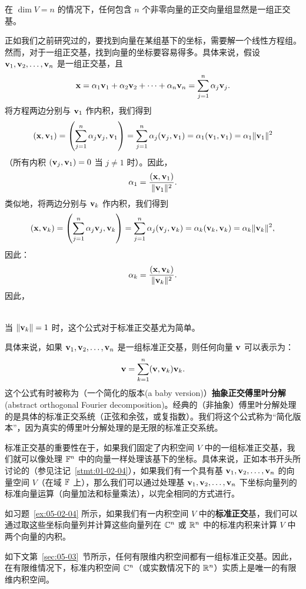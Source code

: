 在 $\dim V = n$ 的情况下，任何包含 $n$ 个非零向量的正交向量组显然是一组正交基。

正如我们之前研究过的，要找到向量在某组基下的坐标，需要解一个线性方程组。然而，对于一组正交基，找到向量的坐标要容易得多。具体来说，假设 $\mathbf{v}_1, \mathbf{v}_2, \dots, \mathbf{v}_n$ 是一组正交基，且 $$\mathbf{x} = \alpha_1 \mathbf{v}_1 + \alpha_2 \mathbf{v}_2 + \dots + \alpha_n \mathbf{v}_n = \sum_{j=1}^n \alpha_j \mathbf{v}_j.$$
将方程两边分别与 $\mathbf{v}_1$ 作内积，我们得到
$$(\mathbf{x}, \mathbf{v}_1) = \left(\sum_{j=1}^n \alpha_j \mathbf{v}_j, \mathbf{v}_1\right) = \sum_{j=1}^n \alpha_j (\mathbf{v}_j, \mathbf{v}_1) = \alpha_1 (\mathbf{v}_1, \mathbf{v}_1) = \alpha_1 \|\mathbf{v}_1\|^2$$
 （所有内积 $(\mathbf{v}_j, \mathbf{v}_1) = 0$ 当 $j \ne 1$ 时）。因此，
 $$\alpha_1 = \frac{(\mathbf{x}, \mathbf{v}_1)}{\|\mathbf{v}_1\|^2}.$$
 类似地，将两边分别与 $\mathbf{v}_k$ 作内积，我们得到
 $$(\mathbf{x}, \mathbf{v}_k) = \left(\sum_{j=1}^n \alpha_j \mathbf{v}_j, \mathbf{v}_k\right) = \sum_{j=1}^n \alpha_j (\mathbf{v}_j, \mathbf{v}_k) = \alpha_k (\mathbf{v}_k, \mathbf{v}_k) = \alpha_k \|\mathbf{v}_k\|^2,$$
  因此：
\begin{equation}\label{eq:05-02-01}
\alpha_k = \frac{(\mathbf{x}, \mathbf{v}_k)}{\|\mathbf{v}_k\|^2}.
\end{equation}
因此，

\\
当 $\|\mathbf{v}_k\| = 1$ 时，这个公式对于标准正交基尤为简单。

具体来说，如果 $\mathbf{v}_1, \mathbf{v}_2, \dots, \mathbf{v}_n$ 是一组标准正交基，则任何向量 $\mathbf{v}$ 可以表示为：
\begin{equation}\label{eq:05-02-02}
\mathbf{v} = \sum_{k=1}^n (\mathbf{v}, \mathbf{v}_k) \mathbf{v}_k.
\end{equation}
这个公式有时被称为（一个简化的版本(a baby version)）\textbf{抽象正交傅里叶分解}(abstract orthogonal
Fourier decomposition)。经典的（非抽象）傅里叶分解处理的是具体的标准正交系统（正弦和余弦，或复指数）。我们将这个公式称为“简化版本”，因为真实的傅里叶分解处理的是无限的标准正交系统。

\begin{remark}\label{stmt:05-02-08}
标准正交基的重要性在于，如果我们固定了内积空间 $V$ 中的一组标准正交基，我们就可以像处理 $\mathbb{F}^n$ 中的向量一样处理该基下的坐标。具体来说，正如本书开头所讨论的（参见注记~\ref{stmt:01-02-04}），如果我们有一个具有基 $\mathbf{v}_1, \mathbf{v}_2, \dots, \mathbf{v}_n$ 的向量空间 $V$（在域 $\mathbb{F}$ 上），那么我们可以通过处理基 $\mathbf{v}_1, \mathbf{v}_2, \dots, \mathbf{v}_n$ 下坐标向量列的标准向量运算（向量加法和标量乘法），以完全相同的方式进行。

如习题~\ref{ex:05-02-04} 所示，如果我们有一内积空间 $V$ 中的\textbf{标准正交}基，我们可以通过取这些坐标向量列并计算这些向量列在 $\mathbb{C}^n$ 或 $\mathbb{R}^n$ 中的标准内积来计算 $V$ 中两个向量的内积。

如下文第~\ref{sec:05-03}~节所示，任何有限维内积空间都有一组标准正交基。因此，在有限维情况下，标准内积空间 $\mathbb{C}^n$（或实数情况下的 $\mathbb{R}^n$）实质上是唯一的有限维内积空间。
\end{remark}


